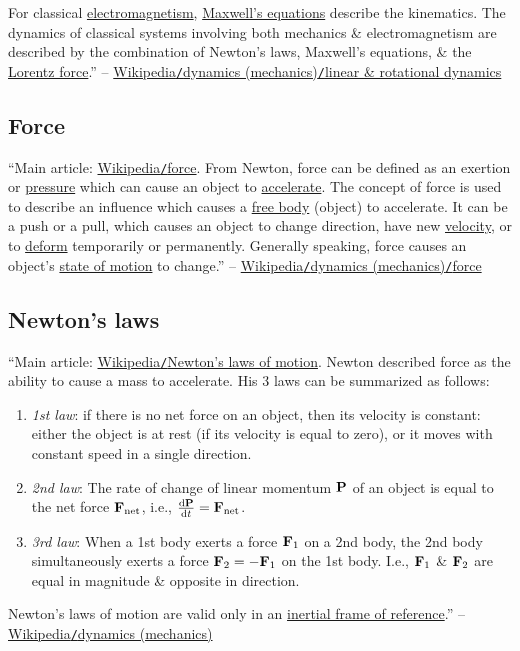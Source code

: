 \documentclass{article}
\begin{document}
For classical \href{https://en.wikipedia.org/wiki/Electromagnetism}{electromagnetism}, \href{https://en.wikipedia.org/wiki/Maxwell%27s_equations}{Maxwell's equations} describe the kinematics. The dynamics of classical systems involving both mechanics \& electromagnetism are described by the combination of Newton's laws, Maxwell's equations, \& the \href{https://en.wikipedia.org/wiki/Lorentz_force}{Lorentz force}.'' -- \href{https://en.wikipedia.org/wiki/Dynamics_(mechanics)#Linear_and_rotational_dynamics}{Wikipedia\texttt{/}dynamics (mechanics)\texttt{/}linear \& rotational dynamics}

\subsection{Force}
``Main article: \href{https://en.wikipedia.org/wiki/Force}{Wikipedia\texttt{/}force}. From Newton, force can be defined as an exertion or \href{https://en.wikipedia.org/wiki/Pressure}{pressure} which can cause an object to \href{https://en.wikipedia.org/wiki/Accelerate}{accelerate}. The concept of force is used to describe an influence which causes a \href{https://en.wikipedia.org/wiki/Free_body}{free body} (object) to accelerate. It can be a push or a pull, which causes an object to change direction, have new \href{https://en.wikipedia.org/wiki/Velocity}{velocity}, or to \href{https://en.wikipedia.org/wiki/Deformation_(mechanics)}{deform} temporarily or permanently. Generally speaking, force causes an object's \href{https://en.wikipedia.org/wiki/Motion_(physics)}{state of motion} to change.'' -- \href{https://en.wikipedia.org/wiki/Dynamics_(mechanics)#Force}{Wikipedia\texttt{/}dynamics (mechanics)\texttt{/}force}

\subsection{Newton's laws}
``Main article: \href{https://en.wikipedia.org/wiki/Newton%27s_laws_of_motion}{Wikipedia\texttt{/}Newton's laws of motion}. Newton described force as the ability to cause a mass to accelerate. His 3 laws can be summarized as follows:
\begin{enumerate}
	\item \textit{1st law}: if there is no net force on an object, then its velocity is constant: either the object is at rest (if its velocity is equal to zero), or it moves with constant speed in a single direction.
	\item \textit{2nd law}: The rate of change of linear momentum ${\bf P}$ of an object is equal to the net force ${\bf F}_{\rm net}$, i.e., $\frac{{\rm d}{\bf P}}{{\rm d}t} = {\bf F}_{\rm net}$.
	\item \textit{3rd law}: When a 1st body exerts a force ${\bf F}_1$ on a 2nd body, the 2nd body simultaneously exerts a force ${\bf F}_2 = -{\bf F}_1$ on the 1st body. I.e., ${\bf F}_1$ \& ${\bf F}_2$ are equal in magnitude \& opposite in direction.
\end{enumerate}
Newton's laws of motion are valid only in an \href{https://en.wikipedia.org/wiki/Inertial_frame_of_reference}{inertial frame of reference}.'' -- \href{https://en.wikipedia.org/wiki/Dynamics_(mechanics)}{Wikipedia{\tt/}dynamics (mechanics)}
\end{document}
